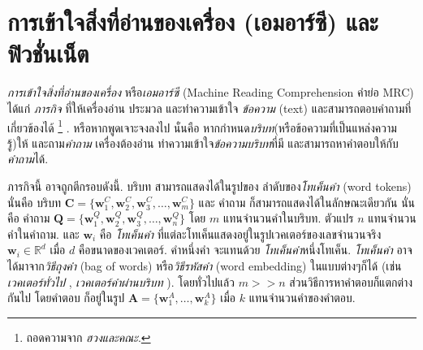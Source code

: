 

\section{การเข้าใจสิ่งที่อ่านของเครื่อง (เอมอาร์ซี) และฟิวชั่นเน็ต}

\textit{การเข้าใจสิ่งที่อ่านของเครื่อง} หรือ\textit{เอมอาร์ซี} (Machine Reading Comprehension คำย่อ MRC)\cite{HuangEtAl2017a}\cite{ChenEtAl2017a} 
ได้แก่
\textit{ภารกิจ} ที่ให้เครื่องอ่าน ประมวล และทำความเข้าใจ \textit{ข้อความ} (text) และสามารถตอบคำถามที่เกี่ยวข้องได้%
\footnote{%
	ถอดความจาก \textit{ฮวงและคณะ}\cite{HuangEtAl2017a}.
}%
.
%
หรือหากพูดเจาะจงลงไป นั่นคือ
หากกำหนด\textit{บริบท}(หรือข้อความที่เป็นแหล่งความรู้)ให้ และถาม\textit{คำถาม}
เครื่องต้องอ่าน ทำความเข้าใจ\textit{ข้อความบริบท}ที่มี และสามารถหาคำตอบให้กับ\textit{คำถาม}ได้.

ภารกิจนี้ อาจถูกตีกรอบดังนี้\cite{HuangEtAl2017a}.
บริบท สามารถแสดงได้ในรูปของ
ลำดับของ\textit{โทเค็นคำ} (word tokens)
นั่นคือ 
บริบท
$\bm{C} = \{\bm{w}_1^C, \bm{w}_2^C, \bm{w}_3^C, \ldots, \bm{w}_m^C\}
\label{eq: opt MRC context}$
และ
คำถาม ก็สามารถแสดงได้ในลักษณะเดียวกัน
นั่นคือ
คำถาม
$\bm{Q} = \{\bm{w}_1^Q, \bm{w}_2^Q, \bm{w}_3^Q, \ldots, \bm{w}_n^Q\}
\label{eq: opt MRC context 2}$
%
โดย $m$ แทนจำนวนคำในบริบท.
ตัวแปร $n$ แทนจำนวนคำในคำถาม.
และ $\bm{w}_i$ คือ \textit{โทเค็นคำ} ที่แต่ละโทเค็นแสดงอยู่ในรูปเวคเตอร์ของเลขจำนวนจริง
$\bm{w}_i \in \mathbb{R}^d$ เมื่อ $d$ คือขนาดของเวคเตอร์.
คำหนึ่งคำ จะแทนด้วย \textit{โทเค็นคำ}หนึ่งโทเค็น.
\textit{โทเค็นคำ} อาจได้มาจาก\textit{วิธีถุงคำ} (bag of words) หรือ\textit{วิธีรหัสคำ} (word embedding) ในแบบต่างๆก็ได้ 
(เช่น 
\textit{เวคเตอร์ทั่วไป}
\cite[Global Vector]{PSM2014a}, 
\textit{เวคเตอร์คำผ่านบริบท}
\cite[Contextualized Word Vector]{McCannEtAl2017a}).
%
โดยทั่วไปแล้ว $m >> n$ ส่วนวิธีการหาคำตอบก็แตกต่างกันไป
โดยคำตอบ ก็อยู่ในรูป $\bm{A} = \{\bm{w}_1^A, \ldots, \bm{w}_k^A \}$ เมื่อ $k$ แทนจำนวนคำของคำตอบ. 

